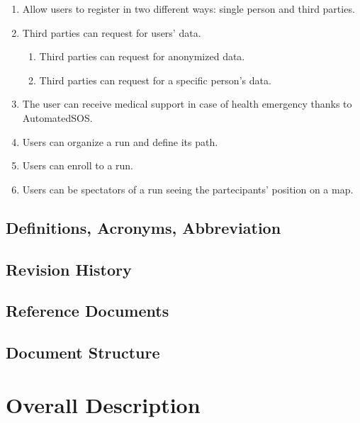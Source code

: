 \documentclass[a4paper]{article}
\begin{document}
\begin{enumerate}
	
	
	\item Allow users to register in two different ways: single person and third parties.
	\item Third parties can request for users' data.
	    
	    \begin{enumerate}[label*=.\arabic*]
	        \item Third parties can request for anonymized data.
	        \item Third parties can request for a specific person's data.
	    \end{enumerate}
	    
	\item The user can receive medical support in case of health emergency thanks to AutomatedSOS.
	
	\item Users can organize a run and define its path.
	\item Users can enroll to a run.
	\item Users can be spectators of a run seeing the partecipants' position on a map.
	
\end{enumerate}

\subsection{Definitions, Acronyms, Abbreviation}


\subsection{Revision History}

\subsection{Reference Documents}

\subsection{Document Structure}

\section{Overall Description}
\end{document}

